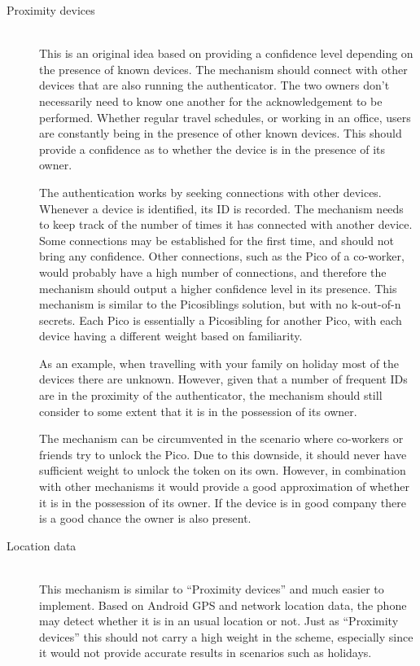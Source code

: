 \begin{description}
  \item[Proximity devices] \hfill \\
  This is an original idea based on providing a confidence level depending on the presence of known devices. The mechanism should connect with other devices that are also running the authenticator. The two owners don't necessarily need to know one another for the acknowledgement to be performed. Whether regular travel schedules, or working in an office, users are constantly being in the presence of other known devices. This should provide a confidence as to whether the device is in the presence of its owner. 
  
  The authentication works by seeking connections with other devices. Whenever a device is identified, its ID is recorded. The mechanism needs to keep track of the number of times it has connected with another device. Some connections may be established for the first time, and should not bring any confidence. Other connections, such as the Pico of a co-worker, would probably have a high number of connections, and therefore the mechanism should output a higher confidence level in its presence. This mechanism is similar to the Picosiblings solution, but with no k-out-of-n secrets. Each Pico is essentially a Picosibling for another Pico, with each device having a different weight based on familiarity.

  As an example, when travelling with your family on holiday most of the devices there are unknown. However, given that a number of frequent IDs are in the proximity of the authenticator, the mechanism should still consider to some extent that it is in the possession of its owner. 
  
  The mechanism can be circumvented in the scenario where co-workers or friends try to unlock the Pico. Due to this downside, it should never have sufficient weight to unlock the token on its own. However, in combination with other mechanisms it would provide a good approximation of whether it is in the possession of its owner. If the device is in good company there is a good chance the owner is also present. 
  
  \item[Location data] \hfill \\
  This mechanism is similar to ``Proximity devices'' and much easier to implement. Based on Android GPS and network location data, the phone may detect whether it is in an usual location or not. Just as ``Proximity devices'' this should not carry a high weight in the scheme, especially since it would not provide accurate results in scenarios such as holidays.
  

\end{description}
